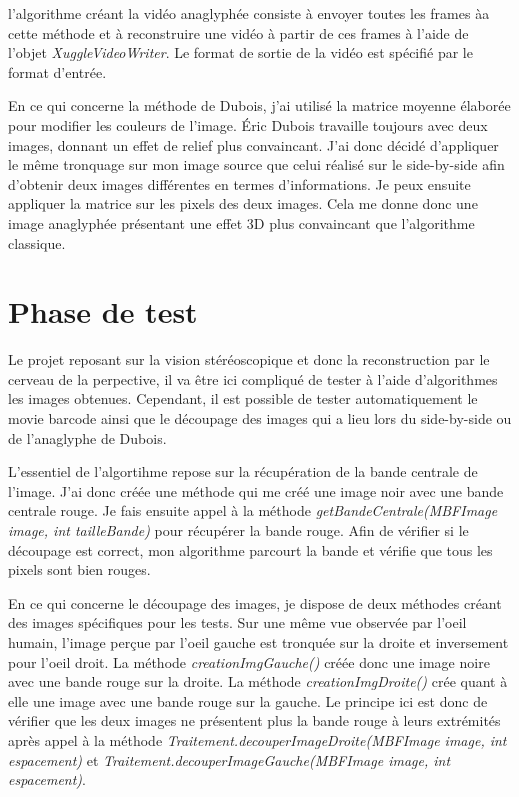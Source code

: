\documentclass[10pt,a4paper]{article}
\begin{document}
l'algorithme créant la vidéo anaglyphée consiste à envoyer toutes les frames àa cette méthode et à reconstruire une vidéo à partir de ces frames à l'aide de l'objet
\textit{XuggleVideoWriter}. Le format de sortie de la vidéo est spécifié par le format d'entrée.

En ce qui concerne la méthode de Dubois, j'ai utilisé la matrice moyenne élaborée pour modifier les couleurs de l'image. Éric Dubois travaille toujours avec deux images, donnant un effet de relief plus
convaincant. J'ai donc décidé d'appliquer le même tronquage sur mon image source que celui réalisé sur le side-by-side afin d'obtenir deux images différentes en termes d'informations. Je peux ensuite
appliquer la matrice sur les pixels des deux images. Cela me donne donc une image anaglyphée présentant une effet 3D plus convaincant que l'algorithme classique.

\section{Phase de test}

Le projet reposant sur la vision stéréoscopique et donc la reconstruction par le cerveau de la perpective, il va être ici compliqué de tester à l'aide d'algorithmes les images obtenues. Cependant, il est possible de tester automatiquement le movie barcode ainsi que le découpage des images qui a lieu lors du side-by-side ou de l'anaglyphe de Dubois. 

L'essentiel de l'algortihme repose sur la récupération de la bande centrale de l'image. J'ai donc créée une méthode qui me créé une image noir avec une bande centrale rouge. Je fais ensuite appel à la méthode \textit{getBandeCentrale(MBFImage image, int tailleBande)} pour récupérer la bande rouge. Afin de vérifier si le découpage est correct, mon algorithme parcourt la bande et vérifie que tous les pixels sont bien rouges. 

En ce qui concerne le découpage des images, je dispose de deux méthodes créant des images spécifiques pour les tests. Sur une même vue observée par l'oeil humain, l'image perçue par l'oeil gauche est tronquée sur la droite et inversement pour l'oeil droit. La méthode \textit{creationImgGauche()} créée donc une image noire avec une bande rouge sur la droite. La méthode \textit{creationImgDroite()} crée quant à elle une image avec une bande rouge sur la gauche. Le principe ici est donc de vérifier que les deux images ne présentent plus la bande rouge à leurs extrémités après appel à la méthode \textit{Traitement.decouperImageDroite(MBFImage image, int espacement)} et \textit{Traitement.decouperImageGauche(MBFImage image, int espacement)}.
\end{document}
